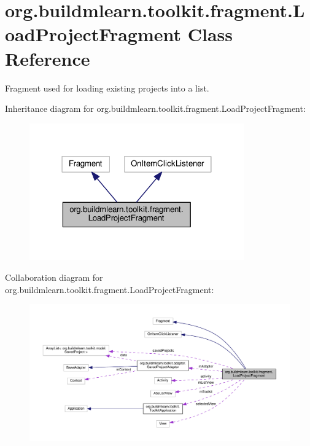 \hypertarget{classorg_1_1buildmlearn_1_1toolkit_1_1fragment_1_1LoadProjectFragment}{}\section{org.\+buildmlearn.\+toolkit.\+fragment.\+Load\+Project\+Fragment Class Reference}
\label{classorg_1_1buildmlearn_1_1toolkit_1_1fragment_1_1LoadProjectFragment}


Fragment used for loading existing projects into a list.  




Inheritance diagram for org.\+buildmlearn.\+toolkit.\+fragment.\+Load\+Project\+Fragment\+:
\nopagebreak
\begin{figure}[H]
\begin{center}
\leavevmode
\includegraphics[width=262pt]{classorg_1_1buildmlearn_1_1toolkit_1_1fragment_1_1LoadProjectFragment__inherit__graph}
\end{center}
\end{figure}


Collaboration diagram for org.\+buildmlearn.\+toolkit.\+fragment.\+Load\+Project\+Fragment\+:
\nopagebreak
\begin{figure}[H]
\begin{center}
\leavevmode
\includegraphics[width=350pt]{classorg_1_1buildmlearn_1_1toolkit_1_1fragment_1_1LoadProjectFragment__coll__graph}
\end{center}
\end{figure}
